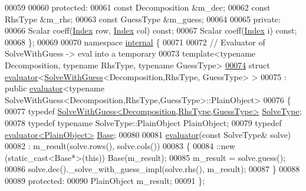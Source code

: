 \begin{DoxyCode}
00059 
00060 \textcolor{keyword}{protected}:
00061   \textcolor{keyword}{const} Decomposition &m\_dec;
00062   \textcolor{keyword}{const} RhsType       &m\_rhs;
00063   \textcolor{keyword}{const} GuessType     &m\_guess;
00064   
00065 \textcolor{keyword}{private}:
00066   Scalar coeff(\hyperlink{namespace_eigen_a62e77e0933482dafde8fe197d9a2cfde}{Index} row, \hyperlink{namespace_eigen_a62e77e0933482dafde8fe197d9a2cfde}{Index} col) \textcolor{keyword}{const};
00067   Scalar coeff(\hyperlink{namespace_eigen_a62e77e0933482dafde8fe197d9a2cfde}{Index} i) \textcolor{keyword}{const};
00068 \};
00069 
00070 \textcolor{keyword}{namespace }\hyperlink{namespaceinternal}{internal} \{
00071 
00072 \textcolor{comment}{// Evaluator of SolveWithGuess -> eval into a temporary}
00073 \textcolor{keyword}{template}<\textcolor{keyword}{typename} Decomposition, \textcolor{keyword}{typename} RhsType, \textcolor{keyword}{typename} GuessType>
\hyperlink{struct_eigen_1_1internal_1_1evaluator_3_01_solve_with_guess_3_01_decomposition_00_01_rhs_type_00_01_guess_type_01_4_01_4}{00074} \textcolor{keyword}{struct }\hyperlink{struct_eigen_1_1internal_1_1evaluator}{evaluator}<\hyperlink{group___iterative_linear_solvers___module_class_eigen_1_1_solve_with_guess}{SolveWithGuess}<Decomposition,RhsType, GuessType> >
00075   : \textcolor{keyword}{public} \hyperlink{struct_eigen_1_1internal_1_1evaluator}{evaluator}<typename SolveWithGuess<Decomposition,RhsType,GuessType>::PlainObject>
00076 \{
00077   \textcolor{keyword}{typedef} \hyperlink{group___iterative_linear_solvers___module_class_eigen_1_1_solve_with_guess}{SolveWithGuess<Decomposition,RhsType,GuessType>} 
      \hyperlink{group___iterative_linear_solvers___module_class_eigen_1_1_solve_with_guess}{SolveType};
00078   \textcolor{keyword}{typedef} \textcolor{keyword}{typename} SolveType::PlainObject PlainObject;
00079   \textcolor{keyword}{typedef} \hyperlink{struct_eigen_1_1internal_1_1evaluator}{evaluator<PlainObject>} \hyperlink{struct_eigen_1_1internal_1_1evaluator}{Base};
00080 
00081   \hyperlink{struct_eigen_1_1internal_1_1evaluator}{evaluator}(\textcolor{keyword}{const} SolveType& solve)
00082     : m\_result(solve.rows(), solve.cols())
00083   \{
00084     ::new (static\_cast<Base*>(\textcolor{keyword}{this})) Base(m\_result);
00085     m\_result = solve.guess();
00086     solve.dec().\_solve\_with\_guess\_impl(solve.rhs(), m\_result);
00087   \}
00088   
00089 \textcolor{keyword}{protected}:  
00090   PlainObject m\_result;
00091 \};

\end{DoxyCode}
